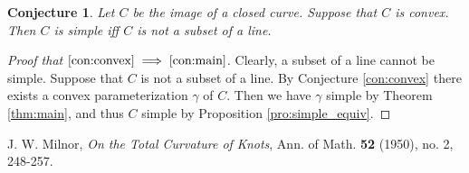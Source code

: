 \documentclass{amsart}
\newtheorem{conjecture}[proposition]{Conjecture}
\theoremstyle{definition}
\theoremstyle{remark}
\begin{document}
\begin{conjecture}
    \label{con:main}
    Let $C$ be the image of a closed curve. Suppose that $C$ is convex.
    Then $C$ is simple iff $C$ is not a subset of a line.
\end{conjecture}

\begin{proof}[Proof that $\ref{con:convex}\implies\ref{con:main}$]
    Clearly, a subset of a line cannot be simple.
    Suppose that $C$ is not a subset of a line. By Conjecture
    \ref{con:convex} there exists a convex parameterization
    $\gamma$ of $C$. Then we have $\gamma$ simple by
    Theorem \ref{thm:main}, and thus $C$ simple by
    Proposition \ref{pro:simple_equiv}.
\end{proof}

\begin{thebibliography}{9}

    J. W. Milnor,
    \emph{On the Total Curvature of Knots},
    Ann. of Math.
    \textbf{52} (1950), no. 2, 248-257.

\end{thebibliography}
\end{document}
